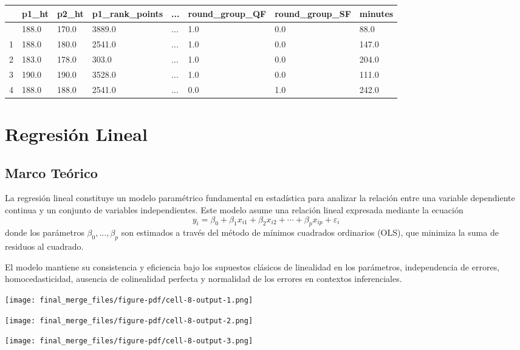 \documentclass[
  letterpaper,
  DIV=11,
  numbers=noendperiod]{scrartcl}
\begin{document}
\begin{longtable}[]{@{}llllllll@{}}
\toprule\noalign{}
& p1\_ht & p2\_ht & p1\_rank\_points & ... & round\_group\_QF &
round\_group\_SF & minutes \\
\midrule\noalign{}
\endhead
\bottomrule\noalign{}
\endlastfoot
0 & 188.0 & 170.0 & 3889.0 & ... & 1.0 & 0.0 & 88.0 \\
1 & 188.0 & 180.0 & 2541.0 & ... & 1.0 & 0.0 & 147.0 \\
2 & 183.0 & 178.0 & 303.0 & ... & 1.0 & 0.0 & 204.0 \\
3 & 190.0 & 190.0 & 3528.0 & ... & 1.0 & 0.0 & 111.0 \\
4 & 188.0 & 188.0 & 2541.0 & ... & 0.0 & 1.0 & 242.0 \\
\end{longtable}

\hypertarget{regresiuxf3n-lineal}{%
\section{Regresión Lineal}\label{regresiuxf3n-lineal}}

\hypertarget{marco-teuxf3rico}{%
\subsection{Marco Teórico}\label{marco-teuxf3rico}}

La regresión lineal constituye un modelo paramétrico fundamental en
estadística para analizar la relación entre una variable dependiente
continua y un conjunto de variables independientes. Este modelo asume
una relación lineal expresada mediante la ecuación
\[y_i = \beta_0 + \beta_1 x_{i1} + \beta_2 x_{i2} + \cdots + \beta_p x_{ip} + \varepsilon_i\]
donde los parámetros \(\beta_0, \dots, \beta_p\) son estimados a través
del método de mínimos cuadrados ordinarios (OLS), que minimiza la suma
de residuos al cuadrado.

El modelo mantiene su consistencia y eficiencia bajo los supuestos
clásicos de linealidad en los parámetros, independencia de errores,
homocedasticidad, ausencia de colinealidad perfecta y normalidad de los
errores en contextos inferenciales.

\texttt{[image: final\_merge\_files/figure-pdf/cell-8-output-1.png]}

\texttt{[image: final\_merge\_files/figure-pdf/cell-8-output-2.png]}

\texttt{[image: final\_merge\_files/figure-pdf/cell-8-output-3.png]}
\end{document}
